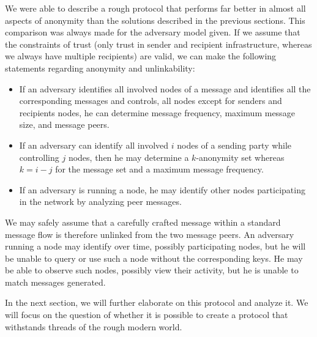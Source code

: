We were able to describe a rough protocol that performs far better in almost all aspects of anonymity than the solutions described in the previous sections. This comparison was always made for the adversary model given. If we assume that the constraints of trust (only trust in sender and recipient infrastructure, whereas we always have multiple recipients) are valid, we can make the following statements regarding anonymity and unlinkability:
\begin{itemize}
	\item If an adversary identifies all involved nodes of a message and identifies all the corresponding messages and controls, all nodes except for senders and recipients nodes, he can determine message frequency, maximum message size, and message peers.
	\item If an adversary can identify all involved $i$ nodes of a sending party while controlling $j$ nodes, then he may determine a $k$-anonymity set whereas $k=i-j$ for the message set and a maximum message frequency. 
	\item If an adversary is running a node, he may identify other nodes participating in the network by analyzing peer messages.
\end{itemize}

We may safely assume that a carefully crafted message within a standard message flow is therefore unlinked from the two message peers. An adversary running a node may identify over time, possibly participating nodes, but he will be unable to query or use such a node without the corresponding keys. He may be able to observe such nodes, possibly view their activity, but he is unable to match messages generated.

In the next section, we will further elaborate on this protocol and analyze it. We will focus on the question of whether it is possible to create a protocol that withstands threads of the rough modern world.

